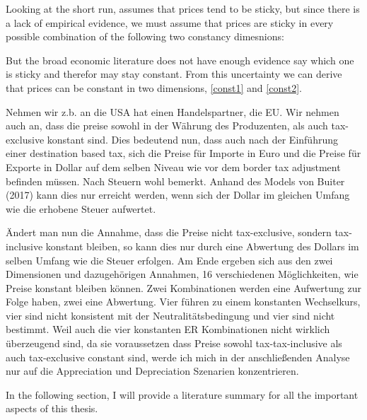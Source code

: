 Looking at the short run, \cite{buiter2017exchange} assumes that prices tend to be sticky, but since there is a lack of empirical evidence, we must assume that prices are sticky in every possible combination of the following two constancy dimesnions:

But the broad economic literature does not have enough evidence say which one is sticky and therefor may stay constant. From this uncertainty we can derive that prices can be constant in two dimensions, \ref{const1} and \ref{const2}.

Nehmen wir z.b. an die USA hat einen Handelspartner, die EU. Wir nehmen auch an, dass die preise sowohl in der Währung des Produzenten, als auch tax-exclusive konstant sind. Dies bedeutend nun, dass auch nach der Einführung einer destination based tax, sich die Preise für Importe in Euro und die Preise für Exporte in Dollar auf dem selben Niveau wie vor dem border tax adjustment befinden müssen. Nach Steuern wohl bemerkt. 
Anhand des Models von Buiter (2017) kann dies nur erreicht werden, wenn sich der Dollar im gleichen Umfang wie die erhobene Steuer aufwertet. 

Ändert man nun die Annahme, dass die Preise nicht tax-exclusive, sondern tax-inclusive konstant bleiben, so kann dies nur durch eine Abwertung des Dollars im selben Umfang wie die Steuer erfolgen. 
Am Ende ergeben sich aus den zwei Dimensionen und dazugehörigen Annahmen, 16 verschiedenen Möglichkeiten, wie Preise konstant bleiben können. Zwei Kombinationen werden eine Aufwertung zur Folge haben, zwei eine Abwertung. Vier führen zu einem konstanten Wechselkurs, vier sind nicht konsistent mit der Neutralitätsbedingung und vier sind nicht bestimmt. Weil auch die vier konstanten ER Kombinationen nicht wirklich überzeugend sind, da sie voraussetzen dass Preise sowohl tax-tax-inclusive als auch tax-exclusive constant sind, werde ich mich in der anschließenden Analyse nur auf die Appreciation und Depreciation Szenarien konzentrieren. 


In the following section, I will provide a literature summary for all the important aspects of this thesis. \\

